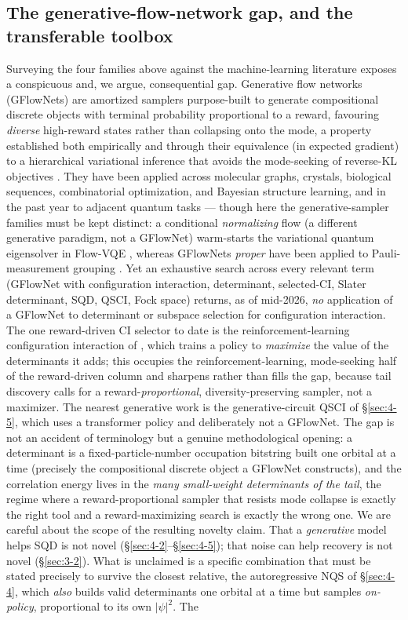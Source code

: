 \documentclass[11pt]{article}
\begin{document}
\subsection{The generative-flow-network gap, and the transferable toolbox}\label{sec:4-6}

Surveying the four families above against the machine-learning literature exposes a conspicuous and, we argue, consequential gap. Generative flow networks (GFlowNets) \cite{bengio2021,malkin2022} are amortized samplers purpose-built to generate compositional discrete objects with terminal probability proportional to a reward, favouring \emph{diverse} high-reward states rather than collapsing onto the mode, a property established both empirically and through their equivalence (in expected gradient) to a hierarchical variational inference that avoids the mode-seeking of reverse-KL objectives \cite{malkin2023}. They have been applied across molecular graphs, crystals, biological sequences, combinatorial optimization, and Bayesian structure learning, and in the past year to adjacent quantum tasks --- though here the generative-sampler families must be kept distinct: a conditional \emph{normalizing} flow (a different generative paradigm, not a GFlowNet) warm-starts the variational quantum eigensolver in Flow-VQE \cite{zou2026}, whereas GFlowNets \emph{proper} have been applied to Pauli-measurement grouping \cite{gfnmeas2024,flowmeas2025}. Yet an exhaustive search across every relevant term (GFlowNet with configuration interaction, determinant, selected-CI, Slater determinant, SQD, QSCI, Fock space) returns, as of mid-2026, \emph{no} application of a GFlowNet to determinant or subspace selection for configuration interaction. The one reward-driven CI selector to date is the reinforcement-learning configuration interaction of \cite{goings2021}, which trains a policy to \emph{maximize} the value of the determinants it adds; this occupies the reinforcement-learning, mode-seeking half of the reward-driven column and sharpens rather than fills the gap, because tail discovery calls for a reward-\emph{proportional}, diversity-preserving sampler, not a maximizer. The nearest generative work is the generative-circuit QSCI of \S\ref{sec:4-5}, which uses a transformer policy and deliberately not a GFlowNet. The gap is not an accident of terminology but a genuine methodological opening: a determinant is a fixed-particle-number occupation bitstring built one orbital at a time (precisely the compositional discrete object a GFlowNet constructs), and the correlation energy lives in the \emph{many small-weight determinants of the tail}, the regime where a reward-proportional sampler that resists mode collapse is exactly the right tool and a reward-maximizing search is exactly the wrong one. We are careful about the scope of the resulting novelty claim. That a \emph{generative} model helps SQD is not novel (\S\ref{sec:4-2}--\S\ref{sec:4-5}); that noise can help recovery is not novel (\S\ref{sec:3-2}). What is unclaimed is a specific combination that must be stated precisely to survive the closest relative, the autoregressive NQS of \S\ref{sec:4-4}, which \emph{also} builds valid determinants one orbital at a time but samples \emph{on-policy}, proportional to its own $|\psi|^2$. The 
\end{document}
